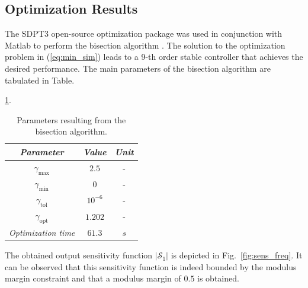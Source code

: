 \documentclass[journal]{IEEEtran}
\begin{document}
\subsection{Optimization Results} 
\label{sec:opt_results}
The SDPT3 open-source optimization package was used in conjunction with Matlab to perform the bisection algorithm \cite{SDPT3}. The solution to the optimization problem in (\ref{eq:min_sim}) leads to a 9-th order stable controller that achieves the desired performance. The main parameters of the bisection algorithm are tabulated in Table.~{\ref{tab:gamma}. 


\begin{table}
\centering
\caption{Parameters resulting from the bisection algorithm.}
\label{tab:gamma}
\begin{tabular}{c|cc}
\textit{\textbf{Parameter}} & \textit{\textbf{Value}} & \textit{\textbf{Unit}} \\ \hline
$\gamma_{\max}$              & $2.5$                    & -                      \\
$\gamma_{\min}$              & $0$              & -                      \\
$\gamma_{\text{tol}}$              & $10^{-6}$               & -                      \\
$\gamma_{\text{opt}}$              & $1.202$                & -                      \\
\textit{Optimization time}\footnotemark  & $61.3$                 & $s$                   
\end{tabular}
\end{table}

The obtained output sensitivity function $| \mathcal{S}_1|$ is depicted in Fig.~{\ref{fig:sens_freq}}. It can be observed that this sensitivity function is indeed bounded by the modulus margin constraint and that a modulus margin of $0.5$ is obtained. %

}
\end{document}
